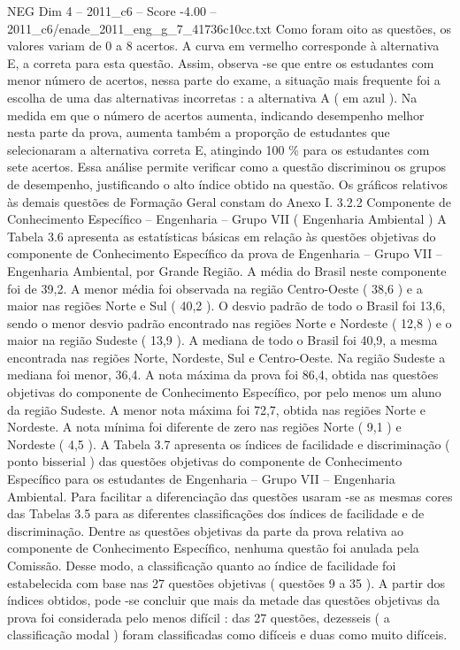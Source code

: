 \begin{textsample}{NEG Dim 4 – 2011\_c6 – Score -4.00 – 2011\_c6/enade\_2011\_eng\_g\_7\_41736c10cc.txt}
Como foram oito as questões, os valores variam de 0 a 8 acertos.
A curva em vermelho corresponde à alternativa E, a correta para esta questão.
Assim, observa -se que entre os estudantes com menor número de acertos, nessa parte do exame, a situação mais frequente foi a escolha de uma das alternativas incorretas : a alternativa A ( em azul ).
Na medida em que o número de acertos aumenta, indicando desempenho melhor nesta parte da prova, aumenta também a proporção de estudantes que selecionaram a alternativa correta E, atingindo 100 \% para os estudantes com sete acertos.
Essa análise permite verificar como a questão discriminou os grupos de desempenho, justificando o alto índice obtido na questão.
Os gráficos relativos às demais questões de Formação Geral constam do Anexo I. 3.2.2 Componente de Conhecimento Específico – Engenharia – Grupo VII ( Engenharia Ambiental ) A Tabela 3.6 apresenta as estatísticas básicas em relação às questões objetivas do componente de Conhecimento Específico da prova de Engenharia – Grupo VII – Engenharia Ambiental, por Grande Região.
A média do Brasil neste componente foi de 39,2.
A menor média foi observada na região Centro-Oeste ( 38,6 ) e a maior nas regiões Norte e Sul ( 40,2 ).
O desvio padrão de todo o Brasil foi 13,6, sendo o menor desvio padrão encontrado nas regiões Norte e Nordeste ( 12,8 ) e o maior na região Sudeste ( 13,9 ).
A mediana de todo o Brasil foi 40,9, a mesma encontrada nas regiões Norte, Nordeste, Sul e Centro-Oeste.
Na região Sudeste a mediana foi menor, 36,4.
A nota máxima da prova foi 86,4, obtida nas questões objetivas do componente de Conhecimento Específico, por pelo menos um aluno da região Sudeste.
A menor nota máxima foi 72,7, obtida nas regiões Norte e Nordeste.
A nota mínima foi diferente de zero nas regiões Norte ( 9,1 ) e Nordeste ( 4,5 ).
A Tabela 3.7 apresenta os índices de facilidade e discriminação ( ponto bisserial ) das questões objetivas do componente de Conhecimento Específico para os estudantes de Engenharia – Grupo VII – Engenharia Ambiental.
Para facilitar a diferenciação das questões usaram -se as mesmas cores das Tabelas 3.5 para as diferentes classificações dos índices de facilidade e de discriminação.
Dentre as questões objetivas da parte da prova relativa ao componente de Conhecimento Específico, nenhuma questão foi anulada pela Comissão.
Desse modo, a classificação quanto ao índice de facilidade foi estabelecida com base nas 27 questões objetivas ( questões 9 a 35 ).
A partir dos índices obtidos, pode -se concluir que mais da metade das questões objetivas da prova foi considerada pelo menos difícil : das 27 questões, dezesseis ( a classificação modal ) foram classificadas como difíceis e duas como muito difíceis.

\end{textsample}
